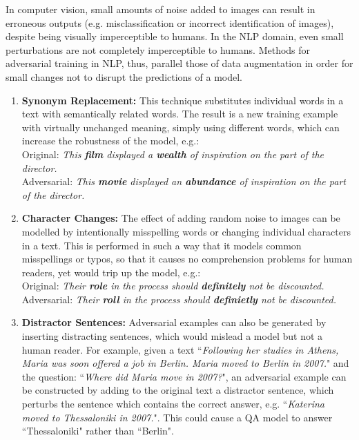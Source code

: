 \begin{exercise}
In computer vision, small amounts of noise added to images can result in erroneous outputs (e.g. misclassification or incorrect identification of images), despite being visually imperceptible to humans. In the NLP domain, even small perturbations are not completely imperceptible to humans. Methods for adversarial training in NLP, thus, parallel those of data augmentation in order for small changes not to disrupt the predictions of a model.
\begin{enumerate}
    \item \textbf{Synonym Replacement:} This technique substitutes individual words in a text with semantically related words. The result is a new training example with virtually unchanged meaning, simply using different words, which can increase the robustness of the model, e.g.:\\
    Original: \textit{This \textbf{film} displayed a \textbf{wealth} of inspiration on the part of the director.}\\
    Adversarial: \textit{This \textbf{movie} displayed an \textbf{abundance} of inspiration on the part of the director.}
    \item \textbf{Character Changes:} The effect of adding random noise to images can be modelled by intentionally misspelling words or changing individual characters in a text. This is performed in such a way that it models common misspellings or typos, so that it causes no comprehension problems for human readers, yet would trip up the model, e.g.:\\
    Original: \textit{Their \textbf{role} in the process should \textbf{definitely} not be discounted.}\\
    Adversarial: \textit{Their \textbf{roll} in the process should \textbf{definietly} not be discounted.}\\
    \item \textbf{Distractor Sentences:} Adversarial examples can also be generated by inserting distracting sentences, which would mislead a model but not a human reader. For example, given a text
    ``\textit{Following her studies in Athens, Maria was soon offered a job in Berlin. Maria moved to Berlin in 2007.}" and the question: ``\textit{Where did Maria move in 2007?}", an adversarial example can be constructed by adding to the original text a distractor sentence, which perturbs the sentence which contains the correct answer, e.g. ``\textit{Katerina moved to Thessaloniki in 2007.}". This could cause a QA model to answer ``Thessaloniki" rather than ``Berlin". \\

\end{enumerate}
\end{exercise}
